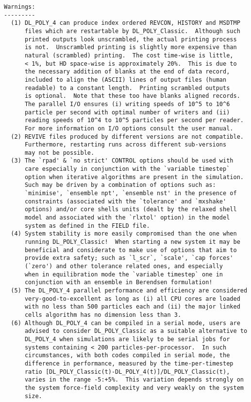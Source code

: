 \begin{verbatim}
Warnings:
---------
  (1) DL_POLY_4 can produce index ordered REVCON, HISTORY and MSDTMP
      files which are restartable by DL_POLY_Classic.  Although such
      printed outputs look unscrambled, the actual printing process
      is not.  Unscrambled printing is slightly more expensive than
      natural (scrambled) printing.  The cost time-wise is little,
      < 1%, but HD space-wise is approximately 20%.  This is due to
      the necessary addition of blanks at the end of data record,
      included to align the (ASCII) lines of output files (human
      readable) to a constant length.  Printing scrambled outputs
      is optional.  Note that these too have blanks aligned records.
      The parallel I/O ensures (i) writing speeds of 10^5 to 10^6
      particle per second with optimal number of writers and (ii)
      reading speeds of 10^4 to 10^5 particles per second per reader.
      For more information on I/O options consult the user manual.
  (2) REVIVE files produced by different versions are not compatible.
      Furthermore, restarting runs across different sub-versions
      may not be possible.
  (3) The `rpad' & `no strict' CONTROL options should be used with
      care especially in conjunction with the `variable timestep`
      option when iterative algorithms are present in the simulation.
      Such may be driven by a combination of options such as:
      `minimise', `ensemble npt', `ensemble nst' in the presence of
      constraints (associated with the `tolerance' and `mxshake'
      options) and/or core shells units (dealt by the relaxed shell
      model and associated with the `rlxtol' option) in the model
      system as defined in the FIELD file.
  (4) System stability is more easily compromised than the one when
      running DL_POLY_Classic!  When starting a new system it may be
      beneficial and considerate to make use of options that aim to
      provide extra safety; such as `l_scr`, `scale', `cap forces'
      (`zero') and other tolerance related ones, and especially
      when in equilibration mode the `variable timestep` one in
      conjunction with an ensemble in Berendsen formulation!
  (5) The DL_POLY_4 parallel performance and efficiency are considered
      very-good-to-excellent as long as (i) all CPU cores are loaded
      with no less than 500 particles each and (ii) the major linked
      cells algorithm has no dimension less than 3.
  (6) Although DL_POLY_4 can be compiled in a serial mode, users are
      advised to consider DL_POLY_Classic as a suitable alternative to
      DL_POLY_4 when simulations are likely to be serial jobs for
      systems containing < 200 particles-per-processor.  In such
      circumstances, with both codes compiled in serial mode, the
      difference in performance, measured by the time-per-timestep
      ratio [DL_POLY_Classic(t)-DL_POLY_4(t)]/DL_POLY_Classic(t),
      varies in the range -5:+5%.  This variation depends strongly on
      the system force-field complexity and very weakly on the system
      size.


\end{verbatim}
